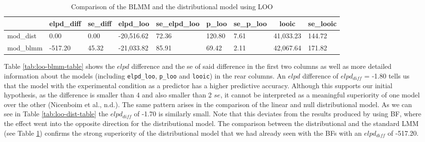 \documentclass[
  doc,12pt,floatsintext]{apa7}
\begin{document}
\begin{table}[tbp]

\begin{center}
\begin{threeparttable}

\caption{\label{tab:loo-blmm-dist-table}Comparison of the BLMM and the distributional model using LOO}

\begin{tabular}{lllllllll}
\toprule
 & \multicolumn{1}{c}{elpd\_diff} & \multicolumn{1}{c}{se\_diff} & \multicolumn{1}{c}{elpd\_loo} & \multicolumn{1}{c}{se\_elpd\_loo} & \multicolumn{1}{c}{p\_loo} & \multicolumn{1}{c}{se\_p\_loo} & \multicolumn{1}{c}{looic} & \multicolumn{1}{c}{se\_looic}\\
\midrule
mod\_dist & 0.00 & 0.00 & -20,516.62 & 72.36 & 120.80 & 7.61 & 41,033.23 & 144.72\\
mod\_blmm & -517.20 & 45.32 & -21,033.82 & 85.91 & 69.42 & 2.11 & 42,067.64 & 171.82\\
\bottomrule
\end{tabular}

\end{threeparttable}
\end{center}

\end{table}

Table \ref{tab:loo-blmm-table} shows the \(elpd\) difference and the se of said difference in the first two columns as well as more detailed information about the models (including \texttt{elpd\_loo}, \texttt{p\_loo} and \texttt{looic}) in the rear columns. An \(elpd\) difference of \(elpd_{diff}\) = -1.80 tells us that the model with the experimental condition as a predictor has a higher predictive accuracy. Although this supports our initial hypothesis, as the difference is smaller than 4 and also smaller than 2 \(se\), it cannot be interpreted as a meaningful superiority of one model over the other (Nicenboim et al., n.d.). The same pattern arises in the comparison of the linear and null distributional model. As we can see in Table \ref{tab:loo-dist-table} the \(elpd_{diff}\) of -1.70 is similarly small. Note that this deviates from the results produced by using BF, where the effect went into the opposite direction for the distributional model. The comparison between the distributional and the standard LMM (see Table \ref{tab:loo-blmm-dist-table}) confirms the strong superiority of the distributional model that we had already seen with the BFs with an \(elpd_{diff}\) of -517.20.
\end{document}
